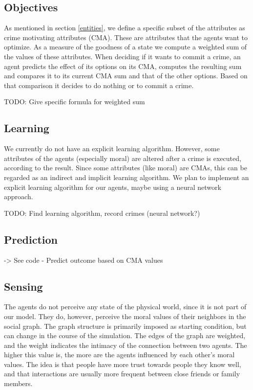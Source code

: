\documentclass{article}
\begin{document}
		\subsection{Objectives}
			As mentioned in section \ref{entities}, we define a specific subset of the attributes as crime
			motivating attributes (CMA). These are attributes that the agents want to optimize. As
			a measure of the goodness of a state we compute a weighted sum of the values of these
			attributes. When deciding if it wants to commit a crime, an agent predicts the effect
			of its options on its CMA, computes the resulting sum and compares it to its current
			CMA sum and that of the other options. Based on that comparison it decides to do
			nothing or to commit a crime.
			\\\par TODO: Give specific formula for weighted sum

		\subsection{Learning}
			We currently do not have an explicit learning algorithm. However,
			some attributes of the agents (especially moral) are altered after a crime is executed,
			according to the result. Since some attributes (like moral) are CMAs, this can be
			regarded as an indirect and implicit learning algorithm.
			We plan to implement an explicit learning algorithm for our agents, maybe using a
			neural network approach.
			\\\par
			TODO: Find learning algorithm, record crimes (neural network?)

		\subsection{Prediction}
			-> See code - Predict outcome based on CMA values

		\subsection{Sensing}
			The agents do not perceive any state of the physical world, since it is not part of our
			model. They do, however, perceive the moral values of their neighbors in the social
			graph. The graph structure is primarily imposed as starting condition, but can change
			in the course of the simulation. The edges of the graph are weighted, and the weight
			indicates the intimacy of the connection between two agents. The higher this value is,
			the more are the agents influenced by each other's moral values. The idea is that
			people have more trust towards people they know well, and that interactions are usually
			more frequent between close friends or family members.
\end{document}
